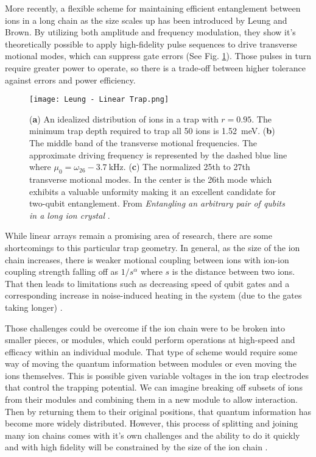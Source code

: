 More recently, a flexible scheme for maintaining efficient entanglement between ions in a long chain as the size scales up has been introduced by Leung and Brown. By utilizing both amplitude and frequency modulation, they show it's theoretically possible to apply high-fidelity pulse sequences to drive transverse motional modes, which can suppress gate errors (See Fig. \ref{fig:Linear Trap}). Those pulses in turn require greater power to operate, so there is a trade-off between higher tolerance against errors and power efficiency.

\begin{figure}[h]
    \texttt{[image: Leung - Linear Trap.png]}
    \caption{(\textbf{a}) An idealized distribution of ions in a trap with $r=0.95$. The minimum trap depth required to trap all 50 ions is \SI{1.52}{\milli\electronvolt}. (\textbf{b}) The middle band of the transverse motional frequencies. The approximate driving frequency is represented by the dashed blue line where $\mu_0 = \omega_{26} - \SI{3.7}{\kilo\hertz}$. (\textbf{c}) The normalized 25th to 27th transverse motional modes. In the center is the 26th mode which exhibits a valuable unformity making it an excellent candidate for two-qubit entanglement. From \textit{Entangling an arbitrary pair of qubits in a long ion crystal} \cite{Leung}.}
    \label{fig:Linear Trap}
\end{figure}

While linear arrays remain a promising area of research, there are some shortcomings to this particular trap geometry. In general, as the size of the ion chain increases, there is weaker motional coupling between ions with ion-ion coupling strength falling off as $1/s^\alpha$ where $s$ is the distance between two ions. That then leads to limitations such as decreasing speed of qubit gates and a corresponding increase in noise-induced heating in the system (due to the gates taking longer) \cite{Bruzewicz}.

Those challenges could be overcome if the ion chain were to be broken into smaller pieces, or modules, which could perform operations at high-speed and efficacy within an individual module. That type of scheme would require some way of moving the quantum information between modules or even moving the ions themselves. This is possible given variable voltages in the ion trap electrodes that control the trapping potential. We can imagine breaking off subsets of ions from their modules and combining them in a new module to allow interaction. Then by returning them to their original positions, that quantum information has become more widely distributed. However, this process of splitting and joining many ion chains comes with it's own challenges and the ability to do it quickly and with high fidelity will be constrained by the size of the ion chain \cite{Bruzewicz}.

